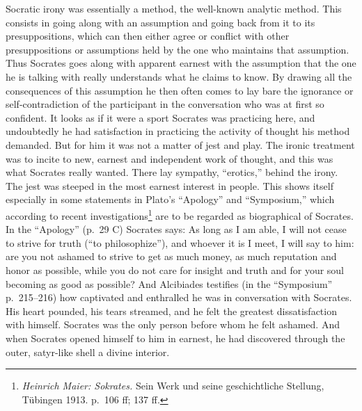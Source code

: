 \documentclass[12pt]{book}
\newcommand{\opage}[1]{\marginnote{\footnotesize\textit{[#1]}}}
\begin{document}
Socratic irony was essentially a method, the well-known analytic method. This consists in going
along with an assumption and going back from it to its presuppositions, which can then either
agree or conflict with other presuppositions or assumptions held by the one who maintains that
assumption. Thus Socrates goes along with apparent earnest with the assumption that the one he
is talking with really understands what he claims to know. By drawing all the consequences of
this assumption he then often comes to lay bare the ignorance or self-contradiction of the
participant in the conversation who was at first so confident. It looks as if it were a sport
Socrates was practicing here, and undoubtedly he had satisfaction in practicing the activity of
thought his method demanded. But for him it was not a matter of jest and play. The ironic
treatment was to incite to new, earnest and independent work of thought, and this was what
Socrates really wanted. There lay sympathy, ``erotics,'' behind the irony. The jest was steeped
in the most earnest interest in people. This shows itself especially in some statements in
Plato's ``Apology'' and ``Symposium,'' which according to recent investigations\footnote{%
\textit{Heinrich Maier: Sokrates.} Sein Werk und seine geschichtliche Stellung, Tübingen 1913.
p.~106 ff; 137 ff.} are to be regarded as biographical of Socrates. In the ``Apology'' (p.~29 C)
Socrates says: As long as I am able, I will not cease to strive for truth (``to
philosophize''), and whoever it is I meet, I will say to him: are you not ashamed to strive to
get as much money, as much reputation and honor as possible, while you do not care for insight
and truth and for your soul becoming as good as possible? And Alcibiades testifies (in the
``Symposium'' p.~215--216) how captivated and enthralled he was in conversation with
\opage{149}Socrates. His heart pounded, his tears streamed, and he felt the greatest
dissatisfaction with himself. Socrates was the only person before whom he felt ashamed. And when
Socrates opened himself to him in earnest, he had discovered through the outer, satyr-like shell
a divine interior.
\end{document}
